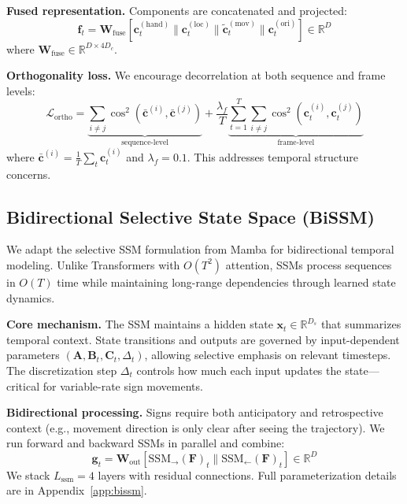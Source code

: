 \documentclass{article}
\theoremstyle{definition}
\theoremstyle{remark}
\begin{document}
\textbf{Fused representation.} Components are concatenated and projected:
\begin{equation}
\mathbf{f}_t = \mathbf{W}_{\text{fuse}} [\mathbf{c}_t^{(\text{hand})} \| \mathbf{c}_t^{(\text{loc})} \| \tilde{\mathbf{c}}_t^{(\text{mov})} \| \mathbf{c}_t^{(\text{ori})}] \in \mathbb{R}^{D}
\end{equation}
where $\mathbf{W}_{\text{fuse}} \in \mathbb{R}^{D \times 4D_c}$.

\textbf{Orthogonality loss.} We encourage decorrelation at both sequence and frame levels:
\begin{equation}
\mathcal{L}_{\text{ortho}} = \underbrace{\sum_{i \neq j} \cos^2(\bar{\mathbf{c}}^{(i)}, \bar{\mathbf{c}}^{(j)})}_{\text{sequence-level}} + \frac{\lambda_f}{T} \underbrace{\sum_{t=1}^{T} \sum_{i \neq j} \cos^2(\mathbf{c}_t^{(i)}, \mathbf{c}_t^{(j)})}_{\text{frame-level}}
\end{equation}
where $\bar{\mathbf{c}}^{(i)} = \frac{1}{T}\sum_t \mathbf{c}_t^{(i)}$ and $\lambda_f = 0.1$. This addresses temporal structure concerns.

\subsection{Bidirectional Selective State Space (BiSSM)}

We adapt the selective SSM formulation from Mamba \citep{gu2023mamba} for bidirectional temporal modeling. Unlike Transformers with $O(T^2)$ attention, SSMs process sequences in $O(T)$ time while maintaining long-range dependencies through learned state dynamics.

\textbf{Core mechanism.} The SSM maintains a hidden state $\mathbf{x}_t \in \mathbb{R}^{D_s}$ that summarizes temporal context. State transitions and outputs are governed by input-dependent parameters $(\mathbf{A}, \mathbf{B}_t, \mathbf{C}_t, \Delta_t)$, allowing selective emphasis on relevant timesteps. The discretization step $\Delta_t$ controls how much each input updates the state---critical for variable-rate sign movements.

\textbf{Bidirectional processing.} Signs require both anticipatory and retrospective context (e.g., movement direction is only clear after seeing the trajectory). We run forward and backward SSMs in parallel and combine:
\begin{equation}
\mathbf{g}_t = \mathbf{W}_{\text{out}}[\text{SSM}_\rightarrow(\mathbf{F})_t \| \text{SSM}_\leftarrow(\mathbf{F})_t] \in \mathbb{R}^D
\end{equation}
We stack $L_{\text{ssm}}=4$ layers with residual connections. Full parameterization details are in Appendix~\ref{app:bissm}.
\end{document}
